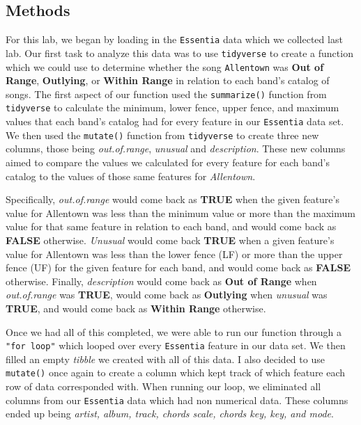 \documentclass{article}\usepackage[]{graphicx}\usepackage[]{xcolor}
\begin{document}
\begin{multicols}{2}
\section{Methods}
For this lab, we began by loading in the \texttt{Essentia} \citep{Essentia} data which we collected last lab. Our first task to analyze this data was to use \texttt{tidyverse} to create a function which we could use to determine whether the song \texttt{Allentown} was \textbf{Out of Range}, \textbf{Outlying}, or \textbf{Within Range} in relation to each band's catalog of songs. The first aspect of our function used the \texttt{summarize()} function from \texttt{tidyverse} to calculate the minimum, lower fence, upper fence, and maximum values that each band's catalog had for every feature in our \texttt{Essentia} data set. We then used the \texttt{mutate()} function from \texttt{tidyverse} to create three new columns, those being \textit{out.of.range}, \textit{unusual} and \textit{description}. These new columns aimed to compare the values we calculated for every feature for each band's catalog to the values of those same features for \textit{Allentown}. 
\par\indent
Specifically, \textit{out.of.range} would come back as \textbf{TRUE} when the given feature's value for Allentown was less than the minimum value or more than the maximum value for that same feature in relation to each band, and would come back as \textbf{FALSE} otherwise. \textit{Unusual} would come back \textbf{TRUE} when a given feature's value for Allentown was less than the lower fence (LF) or more than the upper fence (UF) for the given feature for each band, and would come back as \textbf{FALSE} otherwise. Finally, \textit{description} would come back as \textbf{Out of Range} when \textit{out.of.range} was \textbf{TRUE}, would come back as \textbf{Outlying} when \textit{unusual} was \textbf{TRUE}, and would come back as \textbf{Within Range} otherwise.
\par\indent
Once we had all of this completed, we were able to run our function through a \texttt{"for loop"} which looped over every \texttt{Essentia} feature in our data set. We then filled an empty \textit{tibble} we created with all of this data. I also decided to use \texttt{mutate()} once again to create a column which kept track of which feature each row of data corresponded with. When running our loop, we eliminated all columns from our \texttt{Essentia} data which had non numerical data. These columns ended up being \textit{artist, album, track, chords scale, chords key, key, and mode}.

\end{multicols}
\end{document}
